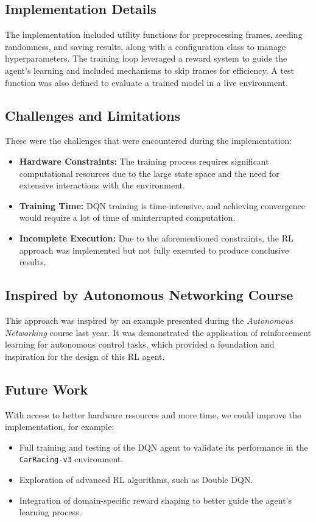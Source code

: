 \documentclass{article}
\begin{document}
\subsection{Implementation Details}

The implementation included utility functions for preprocessing frames, seeding randomness, and saving results, along with a configuration class to manage hyperparameters. The training loop leveraged a reward system to guide the agent's learning and included mechanisms to skip frames for efficiency. A test function was also defined to evaluate a trained model in a live environment.

\subsection{Challenges and Limitations}

These were the challenges that were encountered during the implementation:
\begin{itemize}
    \item \textbf{Hardware Constraints:} The training process requires significant computational resources due to the large state space and the need for extensive interactions with the environment.
    \item \textbf{Training Time:} DQN training is time-intensive, and achieving convergence would require a lot of time of uninterrupted computation.
    \item \textbf{Incomplete Execution:} Due to the aforementioned constraints, the RL approach was implemented but not fully executed to produce conclusive results.
\end{itemize}

\subsection{Inspired by Autonomous Networking Course}

This approach was inspired by an example presented during the \textit{Autonomous Networking} course last year. It was demonstrated the application of reinforcement learning for autonomous control tasks, which provided a foundation and inspiration for the design of this RL agent.

\subsection{Future Work}

With access to better hardware resources and more time, we could improve the implementation, for example:
\begin{itemize}
    \item Full training and testing of the DQN agent to validate its performance in the \texttt{CarRacing-v3} environment.
    \item Exploration of advanced RL algorithms, such as Double DQN.
    \item Integration of domain-specific reward shaping to better guide the agent's learning process.
\end{itemize}
\end{document}
